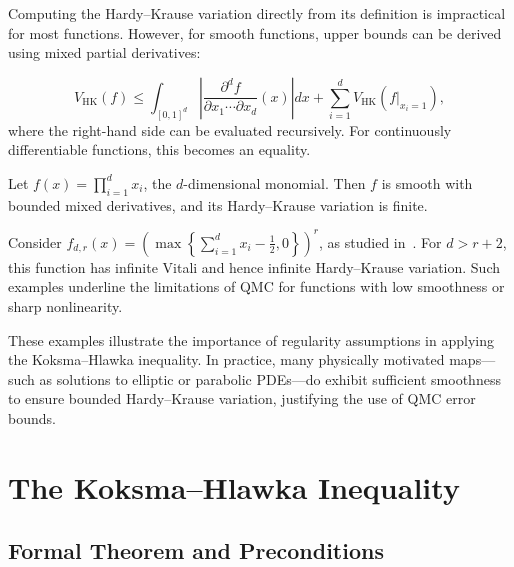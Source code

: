 Computing the Hardy–Krause variation directly from its definition is impractical for most functions. However, for smooth functions, upper bounds can be derived using mixed partial derivatives:

\begin{equation*}
    V_{\mathrm{HK}}(f) \leq \int_{[0,1]^d} \left| \frac{\partial^d f}{\partial x_1 \cdots \partial x_d}(x) \right| dx + \sum_{i=1}^d V_{\mathrm{HK}}(f|_{x_i = 1}),
\end{equation*}
where the right-hand side can be evaluated recursively. For continuously differentiable functions, this becomes an equality.

\begin{example}
Let $f(x) = \prod_{i=1}^d x_i$, the $d$-dimensional monomial. Then $f$ is smooth with bounded mixed derivatives, and its Hardy–Krause variation is finite.
\end{example}

\begin{example}
Consider $f_{d,r}(x) = \left( \max\left\{ \sum_{i=1}^d x_i - \frac{1}{2}, 0 \right\} \right)^r$, as studied in~\cite{owen2005multidimensional}. For $d > r + 2$, this function has infinite Vitali and hence infinite Hardy–Krause variation. Such examples underline the limitations of QMC for functions with low smoothness or sharp nonlinearity.
\end{example}

These examples illustrate the importance of regularity assumptions in applying the Koksma–Hlawka inequality. In practice, many physically motivated maps—such as solutions to elliptic or parabolic PDEs—do exhibit sufficient smoothness to ensure bounded Hardy–Krause variation, justifying the use of QMC error bounds.



\section{The Koksma--Hlawka Inequality}



  \subsection{Formal Theorem and Preconditions}



